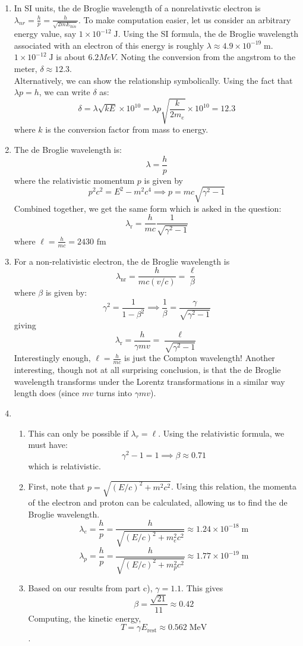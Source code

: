 \begin{sol}
\begin{enumerate}[label=\textbf{(\alph*)}]
\item In SI units, the de Broglie wavelength of a nonrelativstic electron is $\lambda_{nr} = \frac{h}{p} = \frac{h}{\sqrt{2mE_{kin}}}$. To make computation easier, let us consider an arbitrary energy value, say $1 \times 10^{-12}\;\mathrm{J}$. Using the SI formula, the de Broglie wavelength associated with an electron of this energy is roughly $\lambda \approx 4.9 \times 10^{-19}\;\mathrm{m}$. $1 \times 10^{-12}\;\mathrm{J}$ is about $6.2 MeV$. Noting the conversion from the angstrom to the meter, $\delta \approx 12.3$. \\

Alternatively, we can show the relationship symbolically. Using the fact that $\lambda p = h$, we can write $\delta$ as:
$$\delta = \lambda \sqrt{kE} \times 10^{10} = \lambda p\sqrt{\frac{k}{2m_e}} \times 10^{10}=12.3$$
where $k$ is the conversion factor from mass to energy.
\item The de Broglie wavelength is:
$$\lambda = \frac{h}{p}$$
where the relativistic momentum $p$ is given by
$$p^2c^2=E^2-m^2c^4 \implies p = mc\sqrt{\gamma^2-1}$$
Combined together, we get the same form which is asked in the question:
$$\lambda_\text{r} = \frac{h}{mc} \frac{1}{\sqrt{\gamma^2-1}}$$
where $\ell=\frac{h}{mc}=2430 \text{ fm}$ 
\item For a non-relativistic electron, the de Broglie wavelength is
$$\lambda_\text{nr} = \frac{h}{mc(v/c)}= \frac{\ell}{\beta}$$
where $\beta$ is given by:
$$\gamma^2 = \frac{1}{1-\beta^2} \implies \frac{1}{\beta}= \frac{\gamma}{\sqrt{\gamma^2-1}}$$
giving
$$\lambda_\text{r} = \frac{h}{\gamma mv} = \frac{\ell}{\sqrt{\gamma^2-1}}$$
Interestingly enough, $\ell = \frac{h}{mc}$ is just the Compton wavelength! Another interesting, though not at all surprising conclusion, is that the de Broglie wavelength transforms under the Lorentz transformations in a similar way length does (since $mv$ turns into $\gamma mv$).
\item 
\begin{enumerate}[label=(\roman*)]
\item This can only be possible if $\lambda_r=\ell$. Using the relativistic formula, we must have:
$$\gamma^2 - 1 = 1 \implies \beta \approx 0.71$$
which is relativistic.
\item First, note that $p = \sqrt{(E/c)^2 + m^2c^2}$. Using this relation, the momenta of the electron and proton can be calculated, allowing us to find the de Broglie wavelength. $$\lambda_e = \frac{h}{p} = \frac{h}{\sqrt{(E/c)^2 + m_e^2c^2}} \approx 1.24 \times 10^{-18}\;\mathrm{m}$$ $$\lambda_p = \frac{h}{p} = \frac{h}{\sqrt{(E/c)^2 + m_p^2c^2}} \approx 1.77 \times 10^{-19}\;\mathrm{m}$$
\item Based on our results from part c), $\gamma = 1.1$. This gives $$\beta = \frac{\sqrt{21}}{11} \approx 0.42$$ Computing, the kinetic energy, $$T = \gamma E_\text{rest} \approx 0.562\;\text{MeV}$$.
\end{enumerate}
\end{enumerate}
\end{sol}